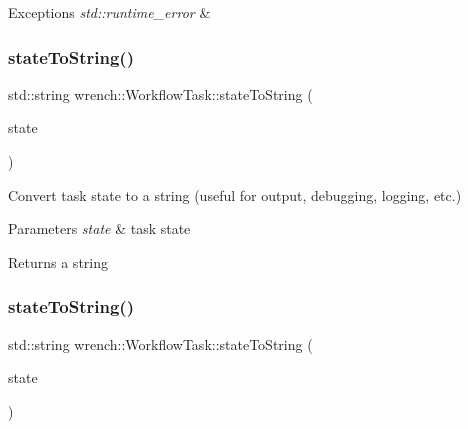 \begin{DoxyExceptions}{Exceptions}
{\em std\+::runtime\+\_\+error} & \\
\hline
\end{DoxyExceptions}
\mbox{\label{classwrench_1_1_workflow_task_a542a6f96bea2d2e67d21bc32c0151e73}} 
\subsubsection{\texorpdfstring{state\+To\+String()}{stateToString()}\hspace{0.1cm}{\footnotesize\ttfamily [1/2]}}
{\footnotesize\ttfamily std\+::string wrench\+::\+Workflow\+Task\+::state\+To\+String (\begin{DoxyParamCaption}\item[{\hyperlink{classwrench_1_1_workflow_task_a1184f3d7aea21e1c87a9b17e84f1f92a}{Workflow\+Task\+::\+State}}]{state }\end{DoxyParamCaption})\hspace{0.3cm}{\ttfamily [static]}}



Convert task state to a string (useful for output, debugging, logging, etc.) 


\begin{DoxyParams}{Parameters}
{\em state} & task state \\
\hline
\end{DoxyParams}
\begin{DoxyReturn}{Returns}
a string 
\end{DoxyReturn}
\mbox{\label{classwrench_1_1_workflow_task_ae018f30098863d46fb32c5a91691a472}} 
\subsubsection{\texorpdfstring{state\+To\+String()}{stateToString()}\hspace{0.1cm}{\footnotesize\ttfamily [2/2]}}
{\footnotesize\ttfamily std\+::string wrench\+::\+Workflow\+Task\+::state\+To\+String (\begin{DoxyParamCaption}\item[{\hyperlink{classwrench_1_1_workflow_task_aa2b860941b37263c26385fd076502e04}{Workflow\+Task\+::\+Internal\+State}}]{state }\end{DoxyParamCaption})\hspace{0.3cm}{\ttfamily [static]}}




